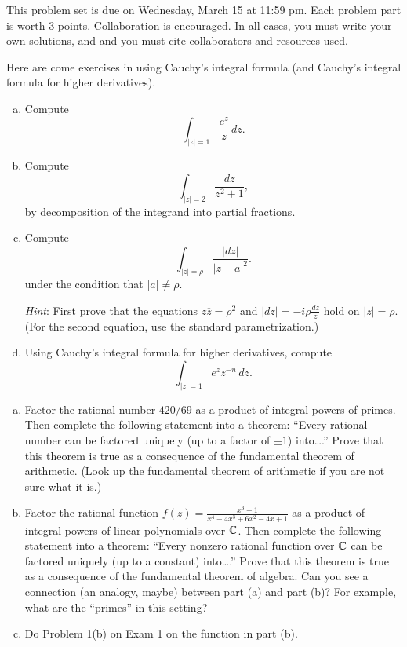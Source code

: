 \maketitle

This problem set is due on Wednesday, March 15 at 11:59 pm. Each problem part is worth 3 points. Collaboration is encouraged. In all cases, you must write your own solutions, and and you must cite collaborators and resources used.

\begin{problem}
  Here are come exercises in using Cauchy's integral formula (and Cauchy's integral formula for higher derivatives).
  \begin{enumerate}[(a)]
    \item Compute
    \[\int_{|z|=1}\frac{e^z}z\,dz.\]
    \item Compute
    \[\int_{|z|=2}\frac{dz}{z^2+1},\]
    by decomposition of the integrand into partial fractions.
    \item Compute
    \[\int_{|z|=\rho}\frac{|dz|}{|z-a|^2}.\]
    under the condition that $|a|\neq\rho$.

    \emph{Hint}: First prove that the equations $z\overline z=\rho^2$ and $|dz|=-i\rho\frac{dz}z$ hold on $|z|=\rho$. (For the second equation, use the standard parametrization.)

    \item Using Cauchy's integral formula for higher derivatives, compute
    \[\int_{|z|=1}e^zz^{-n}\,dz.\]
  \end{enumerate}
\end{problem}

\begin{problem}
  \leavevmode\begin{enumerate}[(a)]
    \item Factor the rational number $420/69$ as a product of integral powers of primes. Then complete the following statement into a theorem: ``Every rational number can be factored uniquely (up to a factor of $\pm 1$) into\ldots.'' Prove that this theorem is true as a consequence of the fundamental theorem of arithmetic. (Look up the fundamental theorem of arithmetic if you are not sure what it is.)
    \item Factor the rational function $f(z)=\frac{x^3-1}{x^4-4x^3+6x^2-4x+1}$ as a product of integral powers of linear polynomials over $\mathbb{C}$. Then complete the following statement into a theorem: ``Every nonzero rational function over $\mathbb{C}$ can be factored uniquely (up to a constant) into\ldots.'' Prove that this theorem is true as a consequence of the fundamental theorem of algebra. Can you see a connection (an analogy, maybe) between part (a) and part (b)? For example, what are the ``primes'' in this setting?
    \item Do Problem 1(b) on Exam 1 on the function in part (b).
  \end{enumerate}
\end{problem}


